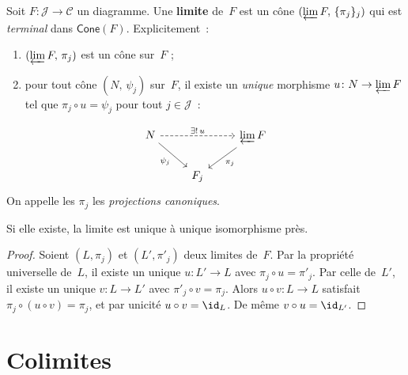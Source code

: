 \begin{definition}[Limite]\label{def:limite}
Soit $F\colon\mathcal{J}\to\mathcal{C}$ un diagramme.
Une \textbf{limite} de~$F$ est un cône $(\varprojlim F,\,\{\pi_j\}_{j})$
qui est \emph{terminal} dans $\mathsf{Cone}(F)$.
Explicitement~:
\begin{enumerate}[label=(\alph*)]
\item $(\varprojlim F,\,\pi_j)$ est un cône sur~$F$ ;
\item pour tout cône $(N,\,\psi_j)$ sur~$F$, il existe un
      \emph{unique} morphisme $u\colon N\to\varprojlim F$
      tel que $\pi_j\circ u = \psi_j$ pour tout $j\in\mathcal{J}$~:
\end{enumerate}
\[
\begin{tikzcd}
N \arrow[dr, "\psi_j"'] \arrow[rr, dashed, "\exists!\, u"] & & \varprojlim F \arrow[dl, "\pi_j"] \\
& F_j &
\end{tikzcd}
\]
On appelle les $\pi_j$ les \emph{projections canoniques}.
\end{definition}

\begin{proposition}\label{prop:limite-unique}
Si elle existe, la limite est unique à unique isomorphisme près.
\end{proposition}

\begin{proof}
Soient $(L,\pi_j)$ et $(L',\pi'_j)$ deux limites de~$F$.
Par la propriété universelle de~$L$, il existe un unique $u\colon L'\to L$
avec $\pi_j\circ u = \pi'_j$. Par celle de~$L'$, il existe un unique
$v\colon L\to L'$ avec $\pi'_j\circ v = \pi_j$.
Alors $u\circ v\colon L\to L$ satisfait $\pi_j\circ(u\circ v)=\pi_j$,
et par unicité $u\circ v = \id_L$. De même $v\circ u = \id_{L'}$.
\end{proof}


\section{Colimites}\label{sec:colimites}

